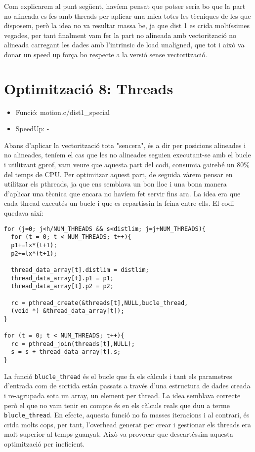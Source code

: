 Com explicarem al punt següent, havíem pensat que potser seria bo que la part no alineada es fes amb threads per aplicar una mica totes les tècniques de les que disposem, però la idea no va resultar massa be, ja que dist 1 es crida moltíssimes vegades, per tant finalment vam fer la part no alineada amb vectorització no alineada carregant les dades amb l'intrinsic de load unaligned, que tot i això va donar un speed up força bo respecte a la versió sense vectorització.

\section{Optimitzaci\'o 8: Threads}
\begin{itemize}
\item{Funció: motion.c/dist1\_special}
\item{SpeedUp: -}
\end{itemize}

Abans d'aplicar la vectorització tota "sencera", és a dir per posicions alineades i no alineades, teníem el cas que les no alineades seguien executant-se amb el bucle i utilitzant gprof, vam veure que aquesta part del codi, consumia gairebé un 80\% del temps de CPU. Per optimitzar aquest part, de seguida vàrem pensar en utilitzar els pthreads, ja que ens semblava un bon lloc i una bona manera d'aplicar una tècnica que encara no havíem fet servir fins ara. La idea era que cada thread executés un bucle i que es repartissin la feina entre ells. El codi quedava així:

\begin{lstlisting}
for (j=0; j<h/NUM_THREADS && s<distlim; j=j+NUM_THREADS){   
  for (t = 0; t < NUM_THREADS; t++){
  p1+=lx*(t+1);
  p2+=lx*(t+1);

  thread_data_array[t].distlim = distlim;
  thread_data_array[t].p1 = p1;
  thread_data_array[t].p2 = p2;

  rc = pthread_create(&threads[t],NULL,bucle_thread,
  (void *) &thread_data_array[t]);
}

for (t = 0; t < NUM_THREADS; t++){
  rc = pthread_join(threads[t],NULL);
  s = s + thread_data_array[t].s;
}		 	
\end{lstlisting}

La funció \texttt{blucle\_thread} és el bucle que fa els càlculs i tant els parametres d'entrada com de sortida están passats a través d'una estructura de dades creada i re-agrupada sota un array, un element per thread. La idea semblava correcte però el que no vam tenir en compte és en els càlculs reals que duu a terme \texttt{blucle\_thread}. En efecte, aquesta funció no fa masses iteracions i al contrari, és crida molts cops, per tant, l'overhead generat per crear i gestionar els threads era molt superior al temps guanyat. Això va provocar que descartéssim aquesta optimització per ineficient.

